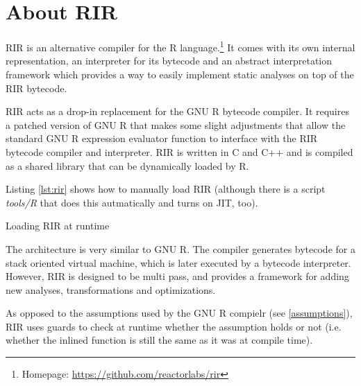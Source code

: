\chapter{About RIR\label{rir}}

RIR is an alternative compiler for the R language.\footnote{Homepage: \url{https://github.com/reactorlabs/rir}} It comes with its own internal representation, an interpreter for its bytecode and an abstract interpretation framework which provides a way to easily implement static analyses on top of the RIR bytecode.

RIR acts as a drop-in replacement for the GNU R bytecode compiler. It requires a patched version of GNU R that makes some slight adjustments that allow the standard GNU R expression evaluator function to interface with the RIR bytecode compiler and interpreter. RIR is written in C and C++ and is compiled as a shared library that can be dynamically loaded by R.

Listing \ref{lst:rir} shows how to manually load RIR (although there is a script \emph{tools/R} that does this autmatically and turns on JIT, too).

\begin{listing}[htbp]
  \caption{\label{lst:rir}Loading RIR at runtime}
  \begin{rcode}
> dyn.load("~/rir/build/librir.so")  # path to the shared object
> source("~/rir/rir/R/rir.R")  # load the API for RIR compiler
> # RIR is now ready:
> f <- rir.compile(function() {})
> f
function() {}
<bytecode: 0x34b4510>
> rir.disassemble(f)
0x2f80538
   guard_fun_  { == 0x2077cd8
   push_  23 # NULL
   ret_ 
  \end{rcode}
\end{listing}

The architecture is very similar to GNU R. The compiler generates bytecode for a stack oriented virtual machine, which is later executed by a bytecode interpreter. However, RIR is designed to be multi pass, and provides a framework for adding new analyses, transformations and optimizations.



As opposed to the assumptions used by the GNU R compielr (see \ref{assumptions}), RIR uses guards to check at runtime whether the assumption holds or not (i.e. whether the inlined function is still the same as it was at compile time).


